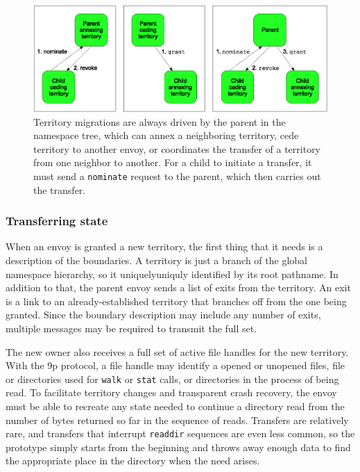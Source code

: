 \begin{figure}[tp]
\centering
\includegraphics[width=.8\textwidth]{figures/grant-topdown}
\caption[Types of territory migrations]{Territory migrations are always driven by the parent in the namespace tree, which can annex a neighboring territory, cede territory to another envoy, or coordinates the transfer of a territory from one neighbor to another. For a child to initiate a transfer, it must send a \texttt{nominate} request to the parent, which then carries out the transfer.}
\label{fig:grant-topdown}
\end{figure}

\subsubsection{Transferring state}\label{sec:migrating-state}

When an envoy is granted a new territory, the first thing that it needs is a description of the boundaries. A territory is just a branch of the global namespace hierarchy, so it uniquelyuniquly identified by its root pathname. In addition to that, the parent envoy sends a list of exits from the territory. An exit is a link to an already-established territory that branches off from the one being granted. Since the boundary description may include any number of exits, multiple messages may be required to transmit the full set.

The new owner also receives a full set of active file handles for the new territory. With the 9p protocol, a file handle may identify a opened or unopened files, file or directories used for \texttt{walk} or \texttt{stat} calls, or directories in the process of being read. To facilitate territory changes and transparent crash recovery, the envoy must be able to recreate any state needed to continue a directory read from the number of bytes returned so far in the sequence of reads. Transfers are relatively rare, and transfers that interrupt \texttt{readdir} sequences are even less common, so the prototype simply starts from the beginning and throws away enough data to find the appropriate place in the directory when the need arises.

